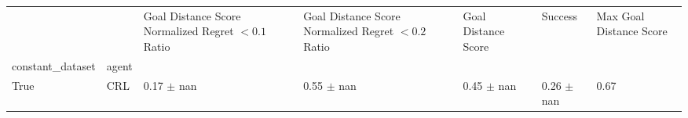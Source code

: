 \begin{tabular}{lllllll}
\toprule
 &  & Goal Distance Score Normalized Regret $< 0.1$ Ratio & Goal Distance Score Normalized Regret $< 0.2$ Ratio & Goal Distance Score & Success & Max Goal Distance Score \\
constant_dataset & agent &  &  &  &  &  \\
\midrule
True & CRL & 0.17 $\pm$ nan & 0.55 $\pm$ nan & 0.45 $\pm$ nan & 0.26 $\pm$ nan & 0.67 \\
\cline{1-7}
\bottomrule
\end{tabular}
